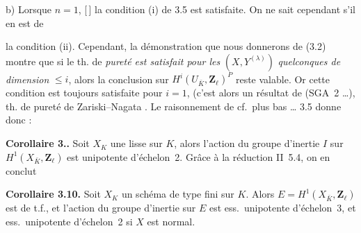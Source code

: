 \documentclass[11pt,a4paper]{article}
\begin{document}
b) Lorsque $n = 1$,    [\,] la condition (i) de 3.5 est  satisfaite. On ne sait cependant s'il en est de \ill{}


la condition (ii). Cependant, la démonstration que nous donnerons  de (3.2) montre que si le th. de \emph{pureté est satisfait pour les} $(X, Y^{(\lambda)})$ \emph{quelconques de dimension} $\leq i$, alors la conclusion sur $H^i(U_{\bar K}, \mathbf{Z}_\ell)^P$ reste valable. Or  cette condition est toujours satisfaite pour $i = 1$, (c'est alors un résultat de   (SGA~2 …), \struck{\ill{}} th. de pureté  de Zariski–Nagata . Le raisonnement de  cf.~plus bas … 3.5 donne donc \struck{\ill{}}  :

\textbf{Corollaire 3.\struck{\ill{}}.} Soit $X_K$ une \struck{\ill{}}   lisse sur $K$, alors l'action du groupe d'inertie $I$ sur $H^1(X_{\bar K}, \mathbf{Z}_\ell)$ est  unipotente d'échelon~2. Grâce à la réduction II~5.4, on en conclut

\textbf{Corollaire 3.10.} Soit $X_K$ un schéma \struck{\ill{}} de type fini sur $K$. Alors $E = H^1(X_{\bar K}, \mathbf{Z}_\ell)$ est de t.f., et l'action du groupe d'inertie sur $E$ est ess.~unipotente d'échelon~3, \struck{\ill{}} et  ess.~unipotente d'échelon~2 si $X$ est normal.
\end{document}
